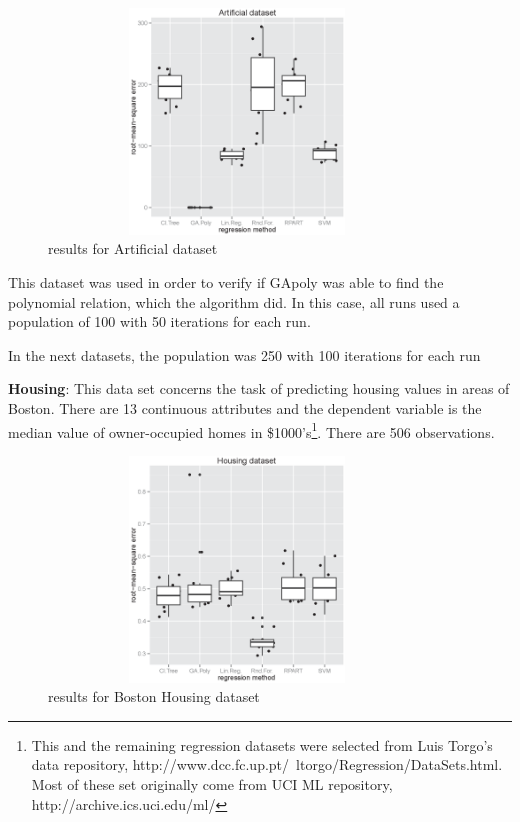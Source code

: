 \documentclass[a4paper, 12pt]{article}
\begin{document}
\begin{figure}[htb]
	\begin{center}
		\includegraphics[height=6cm,width=10cm,angle=0]
			{figures/artificial_dataset1_lambda1.0.eps}
		\caption{results for Artificial dataset}
	\end{center}
\end{figure}

This dataset was used in order to verify if GApoly was able to find the polynomial relation, which the algorithm did. In this case, all runs used a population of 100 with 50 iterations for each run.

In the next datasets, the population was 250 with 100 iterations for each run

\textbf{Housing}: This data set concerns the task of predicting housing values in areas of Boston. There are 13 continuous attributes and the dependent variable is the median value of owner-occupied homes in \$1000's\footnote{This and the remaining regression datasets were selected from Luis Torgo's data repository, http://www.dcc.fc.up.pt/~ltorgo/Regression/DataSets.html. Most of these set originally come from UCI ML repository, http://archive.ics.uci.edu/ml/}. There are 506 observations.

\begin{figure}[htb]
	\begin{center}
		\includegraphics[height=6cm,width=10cm,angle=0]
			{figures/Housing_dataset_lambda0.975.eps}
		\caption{results for Boston Housing dataset}
	\end{center}
\end{figure}
\end{document}
